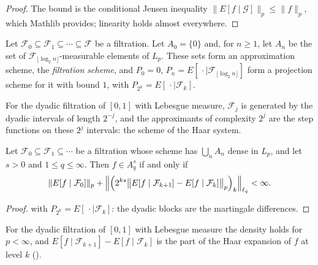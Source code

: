 \begin{proof}
\leanok
The bound is the conditional Jensen inequality $\|E[f \mid \mathcal{G}]\|_p \leq \|f\|_p$,
which Mathlib provides; linearity holds almost everywhere.
\end{proof}

\begin{definition}
\label{def:filtration-scheme}
\leanok
{}
Let $\mathcal{F}_0 \subseteq \mathcal{F}_1 \subseteq \cdots \subseteq \mathcal{F}$ be a
filtration. Let $A_0 = \{0\}$ and, for $n \geq 1$, let $A_n$ be the set of
$\mathcal{F}_{\lfloor \log_2 n \rfloor}$-measurable elements of $L_p$. These sets form an
approximation scheme, the \emph{filtration scheme}, and $P_0 = 0$,
$P_n = E[\,\cdot \mid \mathcal{F}_{\lfloor \log_2 n \rfloor}]$ form a projection scheme for it
with bound $1$, with $P_{2^k} = E[\,\cdot \mid \mathcal{F}_k]$.
\end{definition}

For the dyadic filtration of $[0, 1]$ with Lebesgue measure, $\mathcal{F}_j$ is generated by
the dyadic intervals of
length $2^{-j}$, and the approximants of complexity $2^j$ are the step functions on these
$2^j$ intervals: the scheme of the Haar system.

\begin{theorem}
\label{thm:martingale}
\leanok
{}
Let $\mathcal{F}_0 \subseteq \mathcal{F}_1 \subseteq \cdots$ be a filtration whose scheme
has $\bigcup_n A_n$ dense in $L_p$, and let $s > 0$ and $1 \leq q \leq \infty$. Then
$f \in A^s_q$ if and only if
\[
  \|E[f \mid \mathcal{F}_0]\|_p + \Bigl\| \Bigl(2^{ks} \bigl\|E[f \mid \mathcal{F}_{k+1}] -
  E[f \mid \mathcal{F}_k]\bigr\|_p\Bigr)_k \Bigr\|_{\ell_q} < \infty .
\]
\end{theorem}

\begin{proof}
\leanok
{} with $P_{2^k} = E[\,\cdot \mid \mathcal{F}_k]$: the dyadic blocks are the
martingale differences.
\end{proof}

For the dyadic filtration of $[0, 1]$ with Lebesgue measure the density holds for $p < \infty$,
and
$E[f \mid \mathcal{F}_{k+1}] - E[f \mid \mathcal{F}_k]$ is the part of the Haar expansion of
$f$ at level $k$ ().

